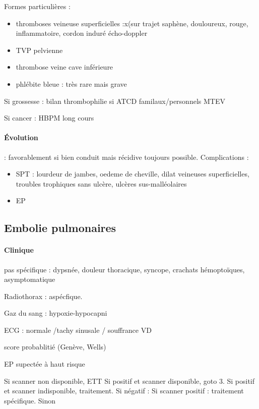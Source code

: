 \documentclass{article}
\begin{document}
Formes particulières :
\begin{itemize}
  \item thromboses veineuse superficielles :x(sur trajet saphène, douloureux,
    rouge, inflammatoire, cordon induré \thus écho-doppler
  \item TVP pelvienne
  \item thrombose veine cave inférieure
  \item phlébite bleue : très rare mais grave
\end{itemize}

Si grossesse : bilan thrombophilie si ATCD familaux/personnels MTEV

Si cancer : HBPM long cours

\paragraph{Évolution} : favorablement si bien conduit mais récidive toujours
possible. Complications : 
\begin{itemize}
  \item SPT : lourdeur de jambes, oedeme de cheville, dilat veineuses
    superficielles, troubles trophiques sans ulcère, ulcères sus-malléolaires
  \item EP
\end{itemize}

\subsection{Embolie pulmonaires}

\paragraph{Clinique} pas spécifique : dypsnée, douleur thoracique, syncope,
crachats hémoptoïques, asymptomatique

Radiothorax : aspécfique. 

Gaz du sang : hypoxie-hypocapni

ECG : normale /tachy sinusale / souffrance VD

\thus score probablitié (Genève, Wells)

\begin{algorithm}
  \caption{EP supectée à haut risque}
  Si scanner non disponible, ETT\;
  Si positif et scanner disponible, goto 3. Si positif et scanner indisponible,
  traitement. Si négatif : \faHandStopO\;
  Si scanner positif : traitement spécifique. Sinon \faHandStopO\;
\end{algorithm}
\end{document}
